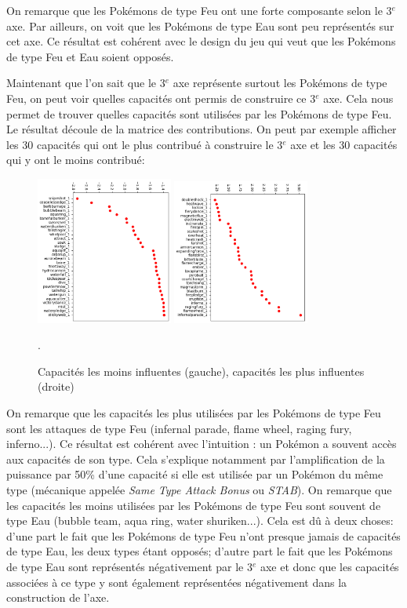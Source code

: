 \documentclass[a4paper,12pt]{article}
\begin{document}
On remarque que les Pokémons de type Feu ont une forte composante selon le
3$^{e}$ axe. Par ailleurs, on voit que les Pokémons de type Eau sont peu
représentés sur cet axe. Ce résultat est cohérent avec le design du jeu qui veut
que les Pokémons de type Feu et Eau soient opposés. 

Maintenant que l'on sait que le 3$^{e}$ axe représente surtout les Pokémons de
type Feu, on peut voir quelles capacités ont permis de construire ce 3$^{e}$
axe. Cela nous permet de trouver quelles capacités sont utilisées par les
Pokémons de type Feu. Le résultat découle de la matrice des contributions. On
peut par exemple afficher les 30 capacités qui ont le plus contribué à
construire le 3$^{e}$ axe et les 30 capacités qui y ont le moins contribué:
\begin{figure}[!h]
    \centering
    \includegraphics[width=0.4\textwidth]{bottom_attaques_MCA.png}
    \includegraphics[width=0.4\textwidth]{top_attaques_MCA.png}
    \caption{Capacités les moins influentes (gauche), capacités les plus
    influentes (droite)}.
    \label{fig:image3}
\end{figure}

On remarque que les capacités les plus utilisées par les Pokémons de type Feu
sont les attaques de type Feu (infernal parade, flame wheel, raging fury,
inferno...). Ce résultat est cohérent avec l'intuition : un Pokémon a souvent
accès aux capacités de son type. Cela s'explique notamment par l'amplification
de la puissance par 50\% d'une capacité si elle est utilisée par un Pokémon du
même type (mécanique appelée \textit{Same Type Attack Bonus} ou \textit{STAB}).
On remarque que les capacités les moins utilisées par les Pokémons de type Feu
sont souvent de type Eau (bubble team, aqua ring, water shuriken...). Cela est
dû à deux choses: d'une part le fait que les Pokémons de type Feu n'ont presque
jamais de capacités de type Eau, les deux types étant opposés; d'autre part le
fait que les Pokémons de type Eau sont représentés négativement par le 3$^{e}$
axe et donc que les capacités associées à ce type y sont également représentées
négativement dans la construction de l'axe.
\end{document}
